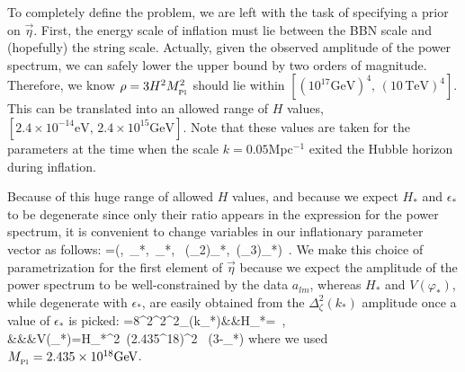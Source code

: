 \documentclass[useAMS,usenatbib,a4paper,onecolumn]{mn2e}
\begin{document}
To completely define the problem, we are left with the task of specifying a prior on $\vec{\eta}$.  First, the energy scale of inflation must lie between the BBN scale and (hopefully) the string scale. Actually, given the observed amplitude of the power spectrum, we can safely lower the upper bound by two orders of magnitude. Therefore, we know $\rho=3H^2M_{_\mathrm{Pl}}^2$ should lie within $\left[ (10^{17}\mathrm{GeV})^4, \, (10 \, \mathrm{TeV})^4 \right]$. This can be translated into an allowed range of $H$ values, $[2.4\times 10^{-14}\mathrm{eV} ,\,2.4\times10^{15}\mathrm{GeV}]$. Note that these values are taken for the parameters at the time when the scale $k=0.05$Mpc$^{-1}$ exited the Hubble horizon during inflation.

Because of this huge range of allowed $H$ values, and because we expect $H_*$ and $\epsilon_*$ to be degenerate since only their ratio appears in the expression for the power spectrum, it is convenient to change variables in our inflationary parameter vector as follows:
\be
	\vec{\eta}=\left(,\, \epsilon_*, \,\eta_*, \, (\eta_2)_*, \,(\eta_3)_*\right)\, .
\ee
We make this choice of parametrization for the first element of $\vec{\eta}$ because we expect the amplitude of the power spectrum to be well-constrained by the data $a_{lm}$, whereas $H_*$ and $V(\varphi_*)$, while degenerate with $\epsilon_*$, are easily obtained from the $\Delta^2_\zeta(k_*)$ amplitude once a value of $\epsilon_*$ is picked:
\bea
	=8\pi^2\Mp^2\Delta^2_\zeta(k_*)\quad&\Rightarrow&\quad H_*=\, ,\\
	&\&&\quad V(\varphi_*)=H_*^2 \,(2.435^{18})^2 \, (3-\epsilon_*)
\eea
where we used $M_{_\mathrm{Pl}}=2.435\times10^{18}\mathrm{GeV}$.
\end{document}
